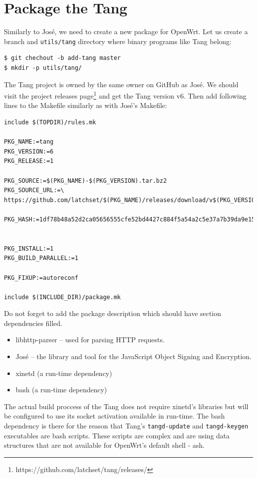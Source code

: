 \section{Package the Tang}
Similarly to José, we need to create a new package for OpenWrt.
Let us create a branch and {\tt utils/tang} directory where binary programs like Tang belong:
\begin{lstlisting}[columns=fixed,basicstyle=\ttfamily\footnotesize,tabsize=4,backgroundcolor=\color{yellow!10}]
$ git chechout -b add-tang master
$ mkdir -p utils/tang/
\end{lstlisting}
The Tang project is owned by the same owner on GitHub as José.
We should visit the project releases page\footnote{https://github.com/latchset/tang/releases/} and get the Tang version v6.
Then add following lines to the Makefile similarly as with José's Makefile:
\begin{lstlisting}[columns=fixed,basicstyle=\ttfamily\footnotesize,tabsize=4,backgroundcolor=\color{yellow!10}]
include $(TOPDIR)/rules.mk

PKG_NAME:=tang
PKG_VERSION:=6
PKG_RELEASE:=1

PKG_SOURCE:=$(PKG_NAME)-$(PKG_VERSION).tar.bz2
PKG_SOURCE_URL:=\
https://github.com/latchset/$(PKG_NAME)/releases/download/v$(PKG_VERSION)/

PKG_HASH:=1df78b48a52d2ca05656555cfe52bd4427c884f5a54a2c5e37a7b39da9e155e3


PKG_INSTALL:=1
PKG_BUILD_PARALLEL:=1

PKG_FIXUP:=autoreconf

include $(INCLUDE_DIR)/package.mk
\end{lstlisting}
Do not forget to add the package description which should have section dependencies filled.
\begin{itemize}
    \item libhttp-parser -- used for parsing HTTP requests.
    \item José -- the library and tool for the JavaScript Object Signing and Encryption.
    \item xinetd (a run-time dependency)
    \item bash (a run-time dependency)
\end{itemize}
The actual build proccess of the Tang does not require xinetd's libraries but will be configured to use its socket activation available in run-time.
The bash dependency is there for the reason that Tang's {\tt tangd-update} and {\tt tangd-keygen} executables are bash scripts.
These scripts are complex and are using data structures that are not available for OpenWrt's default shell - ash.

